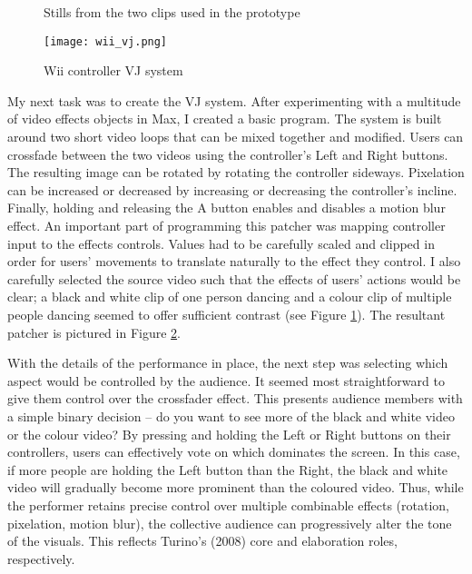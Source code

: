 \begin{figure}
	\centering

	\hspace{0.1cm}
	\caption{Stills from the two clips used in the prototype}

	\label{prototyping1.3}
\end{figure}

\begin{figure}
	\centering

	\texttt{[image: wii\_vj.png]}
	\caption{Wii controller VJ system}

	\label{prototyping1.4}
\end{figure}

My next task was to create the VJ system. After experimenting with a multitude of video effects objects in Max, I created a basic program. The system is built around two short video loops that can be mixed together and modified. Users can crossfade between the two videos using the controller's Left and Right buttons. The resulting image can be rotated by rotating the controller sideways. Pixelation can be increased or decreased by increasing or decreasing the controller's incline. Finally, holding and releasing the A button enables and disables a motion blur effect. An important part of programming this patcher was mapping controller input to the effects controls. Values had to be carefully scaled and clipped in order for users' movements to translate naturally to the effect they control. I also carefully selected the source video such that the effects of users' actions would be clear; a black and white clip of one person dancing and a colour clip of multiple people dancing seemed to offer sufficient contrast (see Figure \ref{prototyping1.3}). The resultant patcher is pictured in Figure \ref{prototyping1.4}.

With the details of the performance in place, the next step was selecting which aspect would be controlled by the audience. It seemed most straightforward to give them control over the crossfader effect. This presents audience members with a simple binary decision -- do you want to see more of the black and white video or the colour video? By pressing and holding the Left or Right buttons on their controllers, users can effectively vote on which dominates the screen. In this case, if more people are holding the Left button than the Right, the black and white video will gradually become more prominent than the coloured video. Thus, while the performer retains precise control over multiple combinable effects (rotation, pixelation, motion blur), the collective audience can progressively alter the tone of the visuals. This reflects Turino's (2008) core and elaboration roles, respectively.

